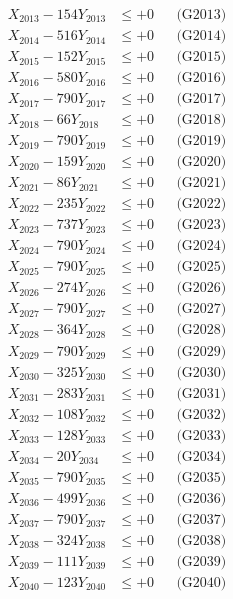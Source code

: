 \documentclass[a4paper,10pt]{article}
\begin{document}
{\begin{align}
X_{2013} - 154Y_{2013} &\leq +0 && \text{(G2013)} \\
X_{2014} - 516Y_{2014} &\leq +0 && \text{(G2014)} \\
X_{2015} - 152Y_{2015} &\leq +0 && \text{(G2015)} \\
X_{2016} - 580Y_{2016} &\leq +0 && \text{(G2016)} \\
X_{2017} - 790Y_{2017} &\leq +0 && \text{(G2017)} \\
X_{2018} - 66Y_{2018} &\leq +0 && \text{(G2018)} \\
X_{2019} - 790Y_{2019} &\leq +0 && \text{(G2019)} \\
X_{2020} - 159Y_{2020} &\leq +0 && \text{(G2020)} \\
\allowbreak
X_{2021} - 86Y_{2021} &\leq +0 && \text{(G2021)} \\
X_{2022} - 235Y_{2022} &\leq +0 && \text{(G2022)} \\
X_{2023} - 737Y_{2023} &\leq +0 && \text{(G2023)} \\
X_{2024} - 790Y_{2024} &\leq +0 && \text{(G2024)} \\
X_{2025} - 790Y_{2025} &\leq +0 && \text{(G2025)} \\
X_{2026} - 274Y_{2026} &\leq +0 && \text{(G2026)} \\
X_{2027} - 790Y_{2027} &\leq +0 && \text{(G2027)} \\
X_{2028} - 364Y_{2028} &\leq +0 && \text{(G2028)} \\
X_{2029} - 790Y_{2029} &\leq +0 && \text{(G2029)} \\
X_{2030} - 325Y_{2030} &\leq +0 && \text{(G2030)} \\
\allowbreak
X_{2031} - 283Y_{2031} &\leq +0 && \text{(G2031)} \\
X_{2032} - 108Y_{2032} &\leq +0 && \text{(G2032)} \\
X_{2033} - 128Y_{2033} &\leq +0 && \text{(G2033)} \\
X_{2034} - 20Y_{2034} &\leq +0 && \text{(G2034)} \\
X_{2035} - 790Y_{2035} &\leq +0 && \text{(G2035)} \\
X_{2036} - 499Y_{2036} &\leq +0 && \text{(G2036)} \\
X_{2037} - 790Y_{2037} &\leq +0 && \text{(G2037)} \\
X_{2038} - 324Y_{2038} &\leq +0 && \text{(G2038)} \\
X_{2039} - 111Y_{2039} &\leq +0 && \text{(G2039)} \\
X_{2040} - 123Y_{2040} &\leq +0 && \text{(G2040)} \\

\end{align}}
\end{document}
